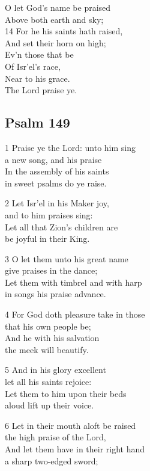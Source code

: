 O let God’s name be praised\\
Above both earth and sky;\\
14 For he his saints hath raised,\\
And set their horn on high;\\
Ev’n those that be\\
Of Isr’el’s race,\\
Near to his grace.\\
The Lord praise ye.

\begin{center}
\quad{}\quad{}
\end{center}

\subsection*{Psalm 149}

1 Praise ye the Lord: unto him sing\\
a new song, and his praise\\
In the assembly of his saints\\
in sweet psalms do ye raise.

2 Let Isr’el in his Maker joy,\\
and to him praises sing:\\
Let all that Zion’s children are\\
be joyful in their King.

3 O let them unto his great name\\
give praises in the dance;\\
Let them with timbrel and with harp\\
in songs his praise advance.

4 For God doth pleasure take in those\\
that his own people be;\\
And he with his salvation\\
the meek will beautify.

5 And in his glory excellent\\
let all his saints rejoice:\\
Let them to him upon their beds\\
aloud lift up their voice.

6 Let in their mouth aloft be raised\\
the high praise of the Lord,\\
And let them have in their right hand\\
a sharp two-edged sword;

